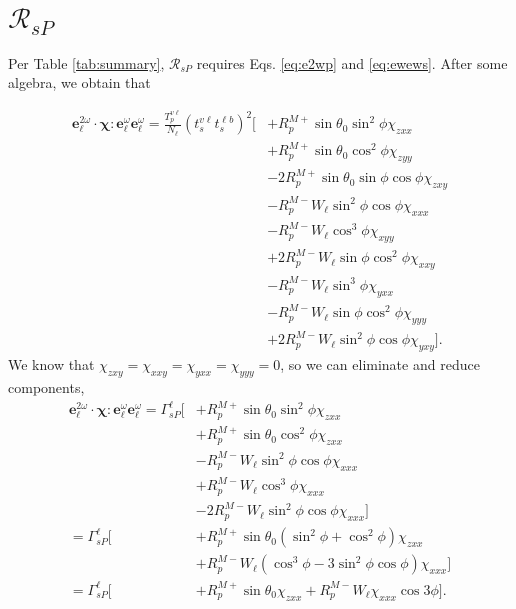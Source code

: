

\section{\texorpdfstring{$\mathcal{R}_{sP}$}{RsP}}

Per Table \ref{tab:summary}, $\mathcal{R}_{sP}$ requires Eqs. \eqref{eq:e2wp}
and \eqref{eq:ewews}. After some algebra, we obtain that

\begin{equation*}
\begin{split}
\mathbf{e}^{2\omega}_{\ell}\cdot\boldsymbol{\chi}:
\mathbf{e}^{\omega}_{\ell}\mathbf{e}^{\omega}_{\ell} =
\frac{T^{v\ell}_{p}}{N_{\ell}}
\left(t^{v\ell}_{s}t^{\ell b}_{s}\right)^{2}
\big[
&+ R^{M+}_{p}\sin\theta_{0}\sin^{2}\phi
   \chi_{zxx}\\
&+ R^{M+}_{p}\sin\theta_{0}\cos^{2}\phi
   \chi_{zyy}\\
&- 2R^{M+}_{p}\sin\theta_{0}\sin\phi\cos\phi
   \chi_{zxy}\\
&- R^{M-}_{p}W_{\ell}\sin^{2}\phi\cos\phi
   \chi_{xxx}\\
&- R^{M-}_{p}W_{\ell}\cos^{3}\phi
   \chi_{xyy}\\
&+ 2R^{M-}_{p}W_{\ell}\sin\phi\cos^{2}\phi
   \chi_{xxy}\\
&- R^{M-}_{p}W_{\ell}\sin^{3}\phi
   \chi_{yxx}\\
&- R^{M-}_{p}W_{\ell}\sin\phi\cos^{2}\phi
   \chi_{yyy}\\
&+ 2R^{M-}_{p}W_{\ell}\sin^{2}\phi\cos\phi
   \chi_{yxy}
\big].
\end{split}
\end{equation*}
We know that $\chi_{zxy}=\chi_{xxy}=\chi_{yxx}=\chi_{yyy}=0$, so we can
eliminate and reduce components,
\begin{equation*}
\begin{split}
\mathbf{e}^{2\omega}_{\ell}\cdot\boldsymbol{\chi}:
\mathbf{e}^{\omega}_{\ell}\mathbf{e}^{\omega}_{\ell} =
\Gamma^{\ell}_{sP}
\big[
&+ R^{M+}_{p}\sin\theta_{0}\sin^{2}\phi\chi_{zxx}\\
&+ R^{M+}_{p}\sin\theta_{0}\cos^{2}\phi\chi_{zxx}\\
&- R^{M-}_{p}W_{\ell}\sin^{2}\phi\cos\phi\chi_{xxx}\\
&+ R^{M-}_{p}W_{\ell}\cos^{3}\phi\chi_{xxx}\\
&- 2R^{M-}_{p}W_{\ell}\sin^{2}\phi\cos\phi\chi_{xxx}
\big]\\
= \Gamma^{\ell}_{sP}
\big[
&+ R^{M+}_{p}\sin\theta_{0}(\sin^{2}\phi + \cos^{2}\phi)\chi_{zxx}\\
&+ R^{M-}_{p}W_{\ell}(\cos^{3}\phi - 3\sin^{2}\phi\cos\phi)\chi_{xxx}
\big]\\
= \Gamma^{\ell}_{sP}
\big[
&+ R^{M+}_{p}\sin\theta_{0}\chi_{zxx} + R^{M-}_{p}W_{\ell}\chi_{xxx}\cos3\phi
\big].
\end{split}
\end{equation*}
